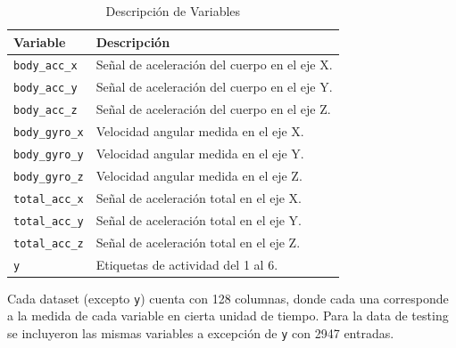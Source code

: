 \documentclass[conference]{IEEEtran}
\begin{document}
\begin{table}[htbp]
    \caption{Descripción de Variables}
    \begin{center}
        \begin{tabular}{|l|l|}
        \hline
        \textbf{Variable} & \textbf{Descripción} \\
        \hline
        \texttt{body\_acc\_x} & Señal de aceleración del cuerpo en el eje X.\\
        \hline
        \texttt{body\_acc\_y} & Señal de aceleración del cuerpo en el eje Y.\\
        \hline
        \texttt{body\_acc\_z} & Señal de aceleración del cuerpo en el eje Z.\\
        \hline
        \texttt{body\_gyro\_x} & Velocidad angular medida en el eje X.\\
        \hline
        \texttt{body\_gyro\_y} & Velocidad angular medida en el eje Y. \\
        \hline
        \texttt{body\_gyro\_z} & Velocidad angular medida en el eje Z. \\
        \hline
        \texttt{total\_acc\_x} & Señal de aceleración total en el eje X. \\
        \hline
        \texttt{total\_acc\_y} & Señal de aceleración total en el eje Y. \\
        \hline
        \texttt{total\_acc\_z} & Señal de aceleración total en el eje Z. \\
        \hline
        \texttt{y} & Etiquetas de actividad del 1 al 6. \\
        \hline
        \end{tabular}
        \label{tab1}
    \end{center}
\end{table}

Cada dataset (excepto \texttt{y}) cuenta con 128 columnas, donde cada una corresponde a la medida de cada variable en cierta unidad de tiempo.
Para la data de testing se incluyeron las mismas variables a excepción de \texttt{y} con 2947 entradas.
\end{document}
